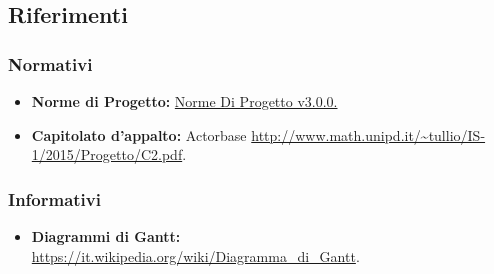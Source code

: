 \documentclass{scalatekids-article}
\begin{document}
\subsection{Riferimenti}
\subsubsection{Normativi}
\begin{itemize}
\item \textbf{Norme di Progetto:} \href{run:../Interni/NormeDiProgetto\_v3.0.0.pdf}{Norme Di Progetto v3.0.0.}
\item \textbf{Capitolato d'appalto:} Actorbase \url{http://www.math.unipd.it/~tullio/IS-1/2015/Progetto/C2.pdf}.
\end{itemize}
\subsubsection{Informativi}
\begin{itemize}
\item \textbf{Diagrammi di Gantt:} \url{https://it.wikipedia.org/wiki/Diagramma_di_Gantt}.
\end{itemize}
\end{document}
